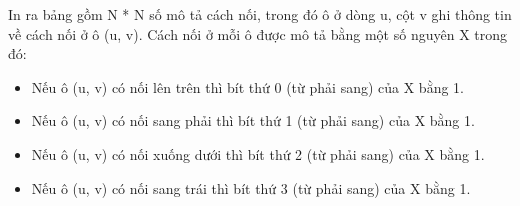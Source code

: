 In ra bảng gồm N * N số mô tả cách nối, trong đó ô ở dòng u, cột v ghi thông tin về cách nối ở ô (u, v). Cách nối ở mỗi ô được mô tả bằng một số nguyên X trong đó:
\begin{itemize}
	\item Nếu ô (u, v) có nối lên trên thì bít thứ 0 (từ phải sang) của X bằng 1.
	\item Nếu ô (u, v) có nối sang phải thì bít thứ 1 (từ phải sang) của X bằng 1.
	\item Nếu ô (u, v) có nối xuống dưới thì bít thứ 2 (từ phải sang) của X bằng 1.
	\item Nếu ô (u, v) có nối sang trái thì bít thứ 3 (từ phải sang) của X bằng 1.
\end{itemize}